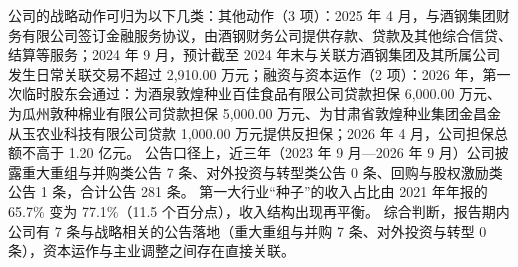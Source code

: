  公司的战略动作可归为以下几类：其他动作（3 项）：2025 年 4 月，与酒钢集团财务有限公司签订金融服务协议，由酒钢财务公司提供存款、贷款及其他综合信贷、结算等服务；2024 年 9 月，预计截至 2024 年末与关联方酒钢集团及其所属公司发生日常关联交易不超过 2,910.00 万元；融资与资本运作（2 项）：2026 年，第一次临时股东会通过：为酒泉敦煌种业百佳食品有限公司贷款担保 6,000.00 万元、为瓜州敦种棉业有限公司贷款担保 5,000.00 万元、为甘肃省敦煌种业集团金昌金从玉农业科技有限公司贷款 1,000.00 万元提供反担保；2026 年 4 月，公司担保总额不高于 1.20 亿元。 公告口径上，近三年（2023 年 9 月---2026 年 9 月）公司披露重大重组与并购类公告 7 条、对外投资与转型类公告 0 条、回购与股权激励类公告 1 条，合计公告 281 条。 第一大行业“种子”的收入占比由 2021 年年报的 65.7\% 变为 77.1\%（11.5 个百分点），收入结构出现再平衡。 综合判断，报告期内公司有 7 条与战略相关的公告落地（重大重组与并购 7 条、对外投资与转型 0 条），资本运作与主业调整之间存在直接关联。

